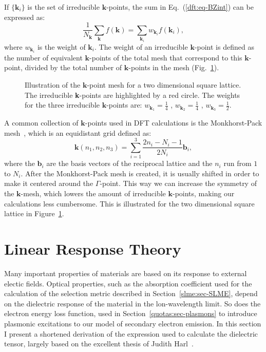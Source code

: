 \begin{refsection}
If $\{\mathbf{k}_i\}$ is the set of irreducible $\mathbf{k}$-points, the sum 
in Eq.~(\ref{dft:eq-BZint}) can be expressed as: 
\begin{equation} 
\frac{1}{N_\mathbf{k}} \sum_\mathbf{k} f(\mathbf{k}) =  \sum_{\mathbf{k}_i} 
w_{\mathbf{k}_i} f(\mathbf{k}_i), 
\end{equation} 
where $w_{\mathbf{k}_i}$ is the weight of $\mathbf{k}_i$. The weight of an 
irreducible $\mathbf{k}$-point is defined as the number of equivalent 
$\mathbf{k}$-points of the total mesh that correspond to this 
$\mathbf{k}$-point, divided by the total number of $\mathbf{k}$-points in the 
mesh (Fig.~\ref{dft:fig-k_mesh}). 
 
\begin{figure}[ht]  
\centering 

\caption{\label{dft:fig-k_mesh}Illustration of the $\mathbf{k}$-point mesh for a 
two dimensional square lattice. The irreducible \textbf{k}-points are 
highlighted by a red circle. The weights for the three irreducible 
$\mathbf{k}$-points are: $w_{\mathbf{k}_1} = \frac{1}{4}$ , $w_{\mathbf{k}_2} 
= \frac{1}{4}$ , $w_{\mathbf{k}_3} = \frac{1}{2}$.} 
\end{figure} 

 \label{dft:sec-monkhorst}
A common collection of $\mathbf{k}$-points used in DFT calculations is the 
Monkhorst-Pack mesh~\cite{Monkhorst1976}, which is an equidistant grid defined 
as: 
\begin{equation} 
\mathbf{k}(n_1,n_2,n_3) = \sum_{i=1}^{3} \frac{2n_i - N_i - 1}{2N_i} 
\mathbf{b}_i, 
\end{equation} 
where the $\mathbf{b}_i$ are the basis vectors of the reciprocal lattice and the $n_i$ run 
from $1$ to $N_i$. After the Monkhorst-Pack mesh is created, it is usually 
shifted in order to make it centered around the $\Gamma$-point. This way we 
can increase the symmetry of the $\mathbf{k}$-mesh, which lowers the amount of 
irreducible $\mathbf{k}$-points, making our calculations less cumbersome. This 
is illustrated for the two dimensional square lattice in 
Figure~\ref{dft:fig-k_mesh}. 
 
\section{Linear Response Theory} \label{dft:sec-linear} 

Many important properties of materials are based on its response to external 
electic fields. Optical properties, such as the absorption coefficient used 
for the calculation of the selection metric described in 
Section~\ref{slme:sec-SLME}, depend on the dielectric response of the material 
in the lon-wavelength limit. So does the electron energy loss function, used in 
Section~\ref{quotas:sec-plasmons} to introduce plasmonic excitations to our 
model of secondary electron emission. In this section I present a shortened 
derivation of the expression used to calculate the dielectric tensor, largely 
based on the excellent thesis of Judith Harl~\cite{Harl2008}.


\end{refsection}
